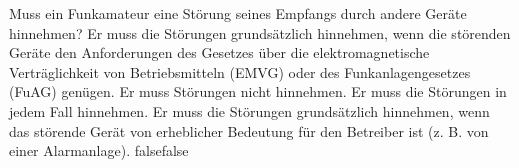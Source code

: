     {Muss ein Funkamateur eine Störung seines Empfangs durch andere Geräte hinnehmen?}
    {Er muss die Störungen grundsätzlich hinnehmen, wenn die störenden Geräte den Anforderungen des Gesetzes über die elektromagnetische Verträglichkeit von Betriebsmitteln (EMVG) oder des Funkanlagengesetzes (FuAG) genügen.}
    {Er muss Störungen nicht hinnehmen.}
    {Er muss die Störungen in jedem Fall hinnehmen.}
    {Er muss die Störungen grundsätzlich hinnehmen, wenn das störende Gerät von erheblicher Bedeutung für den Betreiber ist (z. B. von einer Alarmanlage).}
    {false}{false}